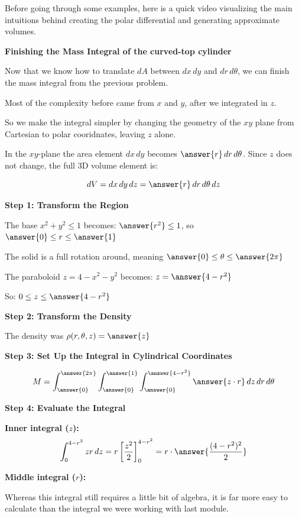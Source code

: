 \documentclass{ximera}
\begin{document}
Before going through some examples, here is a quick video visualizing the main intuitions behind creating the polar differential and generating approximate volumes.


\begin{problem}
\textbf{Finishing the Mass Integral of the curved-top cylinder}

Now that we know how to translate $dA$ between $dx\,dy$ and $dr\,d\theta$, we can finish the mass integral from the previous problem.

Most of the complexity before came from $x$ and $y$, after we integrated in $z$.

So we make the integral simpler by changing the geometry of the $xy$ plane from Cartesian to polar cooridnates, leaving $z$ alone.

In the $xy$-plane the area element $dx\,dy$ becomes $\answer{r}\,dr\,d\theta$.  Since $z$ does not change, the full 3D volume element is:

$$dV = dx\,dy\,dz = \answer{r}\,dr\,d\theta\,dz$$

\textbf{Step 1: Transform the Region}

The base $x^2 + y^2 \leq 1$ becomes: $\answer{r^2} \leq 1$, so $\answer{0} \leq r \leq \answer{1}$

The solid is a full rotation around, meaning $\answer{0} \leq \theta \leq \answer{2\pi}$

The paraboloid $z = 4 - x^2 - y^2$ becomes: $z = \answer{4 - r^2}$

So: $0 \leq z \leq \answer{4-r^2}$

\textbf{Step 2: Transform the Density}

The density was $\rho(r,\theta,z) = \answer{z}$

\textbf{Step 3: Set Up the Integral in Cylindrical Coordinates}

$$M = \int_{\answer{0}}^{\answer{2\pi}} \int_{\answer{0}}^{\answer{1}} \int_{\answer{0}}^{\answer{4-r^2}} \answer{z\cdot r}\,dz\,dr\,d\theta$$

\textbf{Step 4: Evaluate the Integral}

\textbf{Inner integral ($z$):}
$$\int_0^{4-r^2} zr\,dz = r\left[\frac{z^2}{2}\right]_0^{4-r^2} = r\cdot \answer{\frac{(4-r^2)^2}{2}}$$


\textbf{Middle integral ($r$):}

Whereas this integral still requires a little bit of algebra, it is far more easy to calculate than the integral we were working with last module.


\end{problem}
\end{document}
